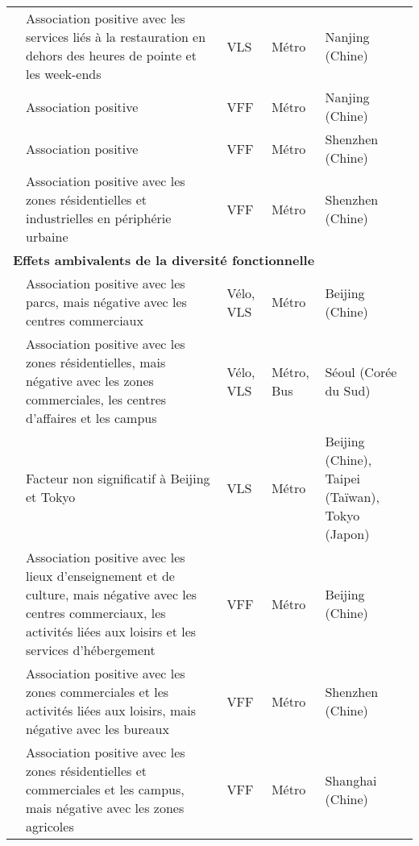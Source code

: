 \begin{longtable}{p{3cm}p{4cm}p{1.5cm}p{1.8cm}p{2.3cm}}
    \small{\textcite{chen_what_2022}}\index{Chen, Wendong|pagebf} & \small{Association positive avec les services liés à la restauration en dehors des heures de pointe et les week-ends} & \small{VLS} & \small{Métro} & \small{Nanjing (Chine)}\\
    \small{\textcite{liu_use_2020}}\index{Liu, Yang|pagebf} & \small{Association positive} & \small{VFF} & \small{Métro} & \small{Nanjing (Chine)}\\
    \small{\textcite{wang_relationship_2020}}\index{Wang, Ruoyu|pagebf} & \small{Association positive} & \small{VFF} & \small{Métro} & \small{Shenzhen (Chine)}\\
    \small{\textcite{guo_built_2020, guo_role_2021}} & \small{Association positive avec les zones résidentielles et industrielles en périphérie urbaine} & \small{VFF} & \small{Métro} & \small{Shenzhen (Chine)}\\
    \hline
\multicolumn{5}{l}{\textbf{Effets ambivalents de la diversité fonctionnelle}}\\
    \small{\textcite{zhao_bicycle-metro_2017}}\index{Zhao, Pengjun|pagebf} & \small{Association positive avec les parcs, mais négative avec les centres commerciaux} & \small{Vélo, VLS} & \small{Métro} & \small{Beijing (Chine)}\\
    \small{\textcite{kim_analysis_2021}}\index{Kim, Minjun|pagebf} & \small{Association positive avec les zones résidentielles, mais négative avec les zones commerciales, les centres d'affaires et les campus} & \small{Vélo, VLS} & \small{Métro, Bus} & \small{Séoul (Corée du Sud)}\\
    \small{\textcite{lin_built_2018}}\index{Lin, Jen-Jia|pagebf} & \small{Facteur non significatif à Beijing et Tokyo} & \small{VLS} & \small{Métro} & \small{Beijing (Chine), Taipei (Taïwan), Tokyo (Japon)}\\
    \small{\textcite{zhou_spatially_2023}}\index{Zhou, X.|pagebf} & \small{Association positive avec les lieux d'enseignement et de culture, mais négative avec les centres commerciaux, les activités liées aux loisirs et les services d'hébergement} & \small{VFF} & \small{Métro} & \small{Beijing (Chine)}\\
    \small{\textcite{guo_dockless_2021}}\index{Guo, Yuanyuan|pagebf} & \small{Association positive avec les zones commerciales et les activités liées aux loisirs, mais négative avec les bureaux} & \small{VFF} & \small{Métro} & \small{Shenzhen (Chine)}\\
    \small{\textcite{hu_examining_2022}}\index{Hu, Songhua|pagebf} & \small{Association positive avec les zones résidentielles et commerciales et les campus, mais négative avec les zones agricoles} & \small{VFF} & \small{Métro} & \small{Shanghai (Chine)}\\

\end{longtable}
